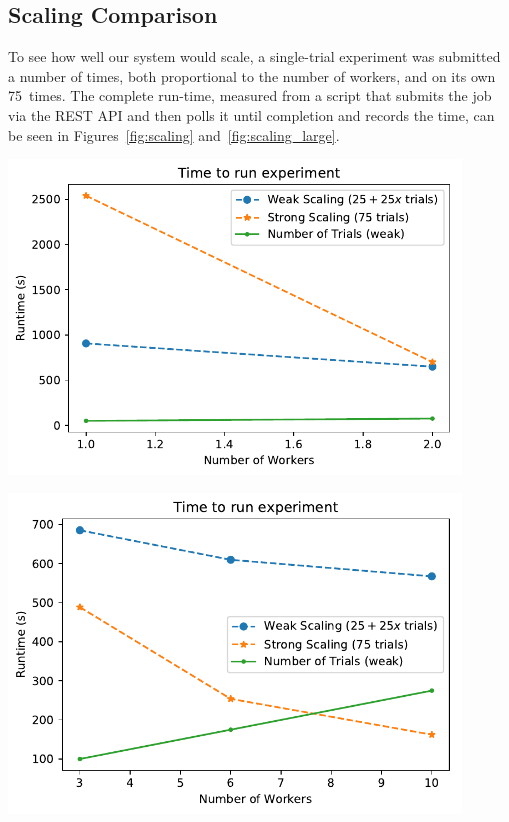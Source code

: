\documentclass[a4paper]{IEEEtran}
\begin{document}
\subsection{Scaling Comparison}
To see how well our system would scale, a single-trial experiment was
submitted a number of times, both proportional to the number of
workers, and on its own 75~times. The complete run-time, measured from
a script that submits the job via the REST API and then polls it until
completion and records the time, can be seen in Figures~\ref{fig:scaling} and~\ref{fig:scaling_large}.
\begin{Figure}
  \centering \includegraphics[width=0.9\textwidth]{scaling_graph}
  \label{fig:scaling}
\end{Figure}

\begin{Figure}
  \centering \includegraphics[width=0.9\textwidth]{scaling_graph_large}
  \label{fig:scaling_large}
\end{Figure}
\end{document}
